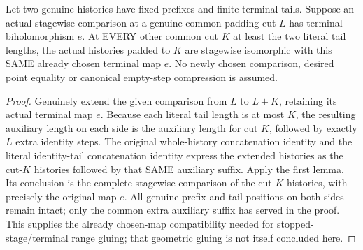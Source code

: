 \begin{theorem}
\label{hir:sharp-actual-curve-exact-terminal-repadding}
\leanok
Let two genuine histories have fixed prefixes and finite terminal tails.
Suppose an actual stagewise comparison at a genuine common padding cut
$L$ has terminal biholomorphism $e$. At EVERY other common cut $K$ at
least the two literal tail lengths, the actual histories padded to $K$
are stagewise isomorphic with this SAME already chosen terminal map $e$.
No newly chosen comparison, desired point equality or canonical
empty-step compression is assumed.
\end{theorem}
\begin{proof}
Genuinely extend the given comparison from $L$ to $L+K$, retaining its
actual terminal map $e$. Because each literal tail length is at most
$K$, the resulting auxiliary length on each side is the auxiliary length
for cut $K$, followed by exactly $L$ extra identity steps. The original
whole-history concatenation identity and the literal identity-tail
concatenation identity express the extended histories as the cut-$K$
histories followed by that SAME auxiliary suffix. Apply the first lemma.
Its conclusion is the complete stagewise comparison of the cut-$K$
histories, with precisely the original map $e$. All genuine prefix and
tail positions on both sides remain intact; only the common extra
auxiliary suffix has served in the proof. This supplies the already
chosen-map compatibility needed for stopped-stage/terminal range gluing;
that geometric gluing is not itself concluded here.
\end{proof}

